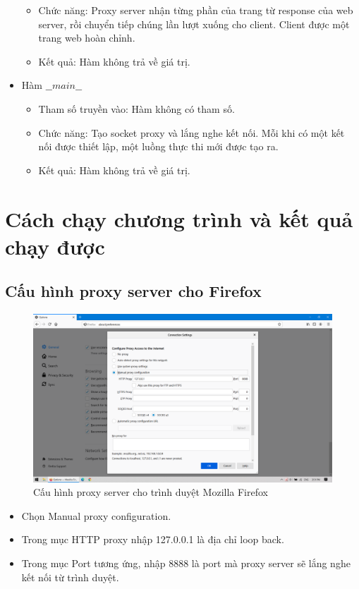 \documentclass[12pt,a4paper]{article}
\begin{document}
\begin{itemize}
\begin{itemize}
						\item Chức năng: Proxy server nhận từng phần của trang từ response của web server, rồi chuyển tiếp chúng lần lượt xuống cho client. Client được một trang web hoàn chỉnh.
						\item Kết quả: Hàm không trả về giá trị.
					\end{itemize}
				\item Hàm $\_\_main\_\_$
					\begin{itemize}
						\item Tham số truyền vào: Hàm không có tham số.
						\item Chức năng: Tạo socket proxy và lắng nghe kết nối. Mỗi khi có một kết nối được thiết lập, một luồng thực thi mới được tạo ra.
						\item Kết quả: Hàm không trả về giá trị.
					\end{itemize}
			\end{itemize}
	\section{Cách chạy chương trình và kết quả chạy được}
		\subsection{Cấu hình proxy server cho Firefox}
			\begin{center}
				\begin{figure}[H]
					\begin{center}
						\includegraphics[scale=.25]{images/run_setting}
					\end{center}
					\caption{Cấu hình proxy server cho trình duyệt Mozilla Firefox}
				\end{figure}
			\end{center}
			\begin{itemize}
				\item Chọn Manual proxy configuration.
				\item Trong mục HTTP proxy nhập 127.0.0.1 là địa chỉ loop back.
				\item Trong mục Port tương ứng, nhập 8888 là port mà proxy server sẽ lắng nghe kết nối từ trình duyệt.
			\end{itemize}
\end{document}
